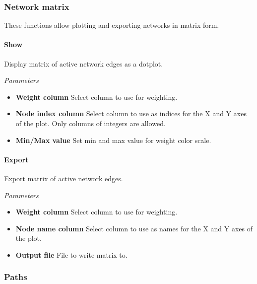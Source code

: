 \begin{comment}
\paragraph{Divergence} Plots average divergence scores between replicas against simulation time as described in section \ref{sec:divergence}.
\end{comment}

\subsubsection{Network matrix}

These functions allow plotting and exporting networks in matrix form.

\paragraph{Show} Display matrix of active network edges as a dotplot.

\textit{Parameters}
\begin{itemize}
\item \textbf{Weight column} Select column to use for weighting.
\item \textbf{Node index column} Select column to use as indices for the X and Y axes of the plot. Only columns of integers are allowed.
\item \textbf{Min/Max value} Set min and max value for weight color scale.
\end{itemize}

\paragraph{Export} Export matrix of active network edges. 

\textit{Parameters}
\begin{itemize}
\item \textbf{Weight column} Select column to use for weighting.
\item \textbf{Node name column} Select column to use as names for the X and Y axes of the plot.
\item \textbf{Output file} File to write matrix to.
\end{itemize}

\subsubsection{Paths}

